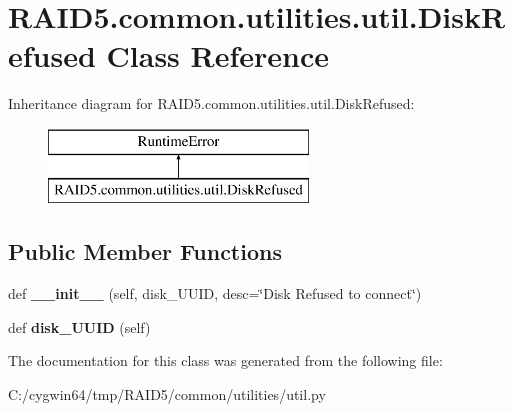 \hypertarget{class_r_a_i_d5_1_1common_1_1utilities_1_1util_1_1_disk_refused}{}\section{R\+A\+I\+D5.\+common.\+utilities.\+util.\+Disk\+Refused Class Reference}
\label{class_r_a_i_d5_1_1common_1_1utilities_1_1util_1_1_disk_refused}
Inheritance diagram for R\+A\+I\+D5.\+common.\+utilities.\+util.\+Disk\+Refused\+:\begin{figure}[H]
\begin{center}
\leavevmode
\includegraphics[height=2.000000cm]{class_r_a_i_d5_1_1common_1_1utilities_1_1util_1_1_disk_refused}
\end{center}
\end{figure}
\subsection*{Public Member Functions}
\begin{DoxyCompactItemize}
\item 
\mbox{\label{class_r_a_i_d5_1_1common_1_1utilities_1_1util_1_1_disk_refused_ac5eb59596d5f7689eb3c8bd8b4158c3c}} 
def {\bfseries \+\_\+\+\_\+init\+\_\+\+\_\+} (self, disk\+\_\+\+U\+U\+ID, desc=\char`\"{}Disk Refused to connect\char`\"{})
\item 
\mbox{\label{class_r_a_i_d5_1_1common_1_1utilities_1_1util_1_1_disk_refused_ab08b8f739c377d8651c0a22c8dd554b9}} 
def {\bfseries disk\+\_\+\+U\+U\+ID} (self)
\end{DoxyCompactItemize}


The documentation for this class was generated from the following file\+:\begin{DoxyCompactItemize}
\item 
C\+:/cygwin64/tmp/\+R\+A\+I\+D5/common/utilities/util.\+py\end{DoxyCompactItemize}
